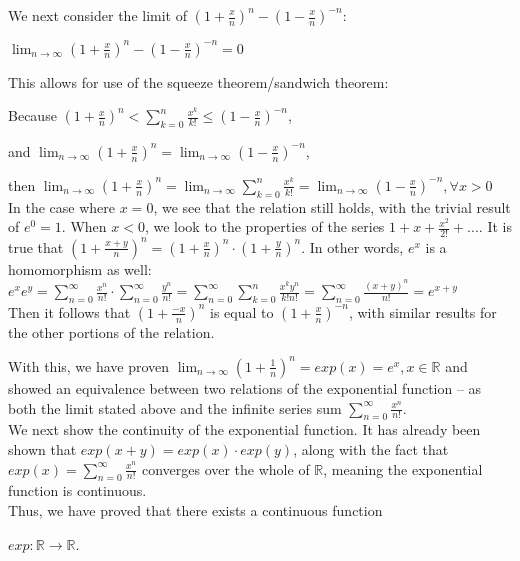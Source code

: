 \documentclass[12pt]{article}
\newcommand{\R}{\mathbb{R}}
\begin{document}
We next consider the limit of $(1 + \frac{x}{n})^n - (1-\frac{x}{n})^{-n}$:

$\lim_{n \rightarrow \infty} (1 + \frac{x}{n})^n - (1-\frac{x}{n})^{-n} = 0$

This allows for use of the squeeze theorem/sandwich theorem:

Because $(1 + \frac{x}{n})^n < \sum_{k=0}^n \frac{x^k}{k!} \leq (1-\frac{x}{n})^{-n}$,

and $\lim_{n \rightarrow \infty} (1 + \frac{x}{n})^n = 
\lim_{n \rightarrow \infty} (1-\frac{x}{n})^{-n}$,

then
$\lim_{n \rightarrow \infty} (1 + \frac{x}{n})^n = 
\lim_{n \rightarrow \infty} \sum_{k=0}^n \frac{x^k}{k!} = 
\lim_{n \rightarrow \infty}(1-\frac{x}{n})^{-n}, \forall x > 0$\\

In the case where $x = 0$, we see that the relation still holds, with the trivial result of $e^0 = 1$. When $x < 0$, we look to the properties of the series $1 + x + \frac{x^2}{2!} + ...$. It is true that $(1 + \frac{x+y}{n})^n = (1 + \frac{x}{n})^n \cdot (1 + \frac{y}{n})^n$. In other words, $e^x$ is a homomorphism as well: \\

$e^xe^y = \sum_{n=0}^\infty \frac{x^n}{n!} \cdot \sum_{n=0}^\infty \frac{y^n}{n!} =
\sum_{n=0}^\infty \sum_{k=0}^n \frac{x^ky^n}{k!n!} =
\sum_{n=0}^\infty \frac{(x+y)^n}{n!} = e^{x+y}$\\

Then it follows that $(1 + \frac{-x}{n})^n$ is equal to $(1 + \frac{x}{n})^{-n}$, with similar results for the other portions of the relation.


With this, we have proven $\lim_{n \rightarrow \infty} (1+\frac{1}{n})^n = exp(x) = e^x , x \in \R$ and showed an equivalence between two relations of the exponential function -- as both the limit stated above and the infinite series sum $\sum_{n=0}^\infty \frac{x^n}{n!}$.\\

We next show the continuity of the exponential function. It has already been shown that $exp(x+y) = exp(x) \cdot exp(y)$, along with the fact that $exp(x) = \sum_{n=0}^\infty \frac{x^n}{n!}$ converges over the whole of $\R$, meaning the exponential function is continuous.\\

Thus, we have proved that there exists a continuous function 

$exp: \R \rightarrow \R$.\\
\end{document}
